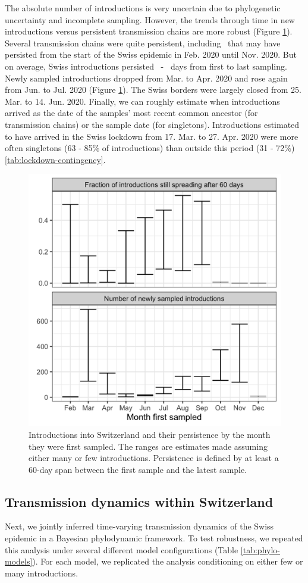 \documentclass[9pt,twoside,lineno]{pnas-new} %
\begin{document}
The absolute number of introductions is very uncertain due to phylogenetic uncertainty and incomplete sampling. However, the trends through time in new introductions versus persistent transmission chains are more robust (Figure \ref{fig:chain-longevity}). Several transmission chains were quite persistent, including \nspanningchainsfebnovmin\ that may have persisted from the start of the Swiss epidemic in Feb. 2020 until Nov. 2020. But on average, Swiss introductions persisted \meantimetolastsamplemax\ - \meantimetolastsamplemin\ days from first to last sampling. Newly sampled introductions dropped from Mar. to Apr. 2020 and rose again from Jun. to Jul. 2020 (Figure \ref{fig:chain-longevity}). The Swiss borders were largely closed from 25. Mar. to 14. Jun. 2020. Finally, we can roughly estimate when introductions arrived as the date of the samples' most recent common ancestor (for transmission chains) or the sample date (for singletons). Introductions estimated to have arrived in the Swiss lockdown from 17. Mar. to 27. Apr. 2020 were more often singletons (63 - 85\% of introductions) than outside this period (31 - 72\%) \ref{tab:lockdown-contingency}.

\begin{figure}[tbhp]
\centering
\includegraphics[width=.4\linewidth]{figures/introductions_and_persistance.png}
\caption{Introductions into Switzerland and their persistence by the month they were first sampled. The ranges are estimates made assuming either many or few introductions. Persistence is defined by at least a 60-day span between the first sample and the latest sample.}
\label{fig:chain-longevity}
\end{figure}

\subsection{Transmission dynamics within Switzerland}

Next, we jointly inferred time-varying transmission dynamics of the Swiss epidemic in a Bayesian phylodynamic framework. To test robustness, we repeated this analysis under several different model configurations (Table \ref{tab:phylo-models}). For each model, we replicated the analysis conditioning on either few or many introductions. 
\end{document}
